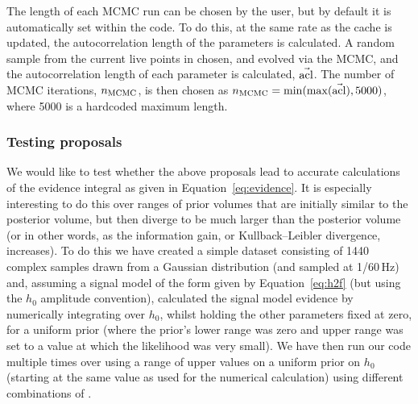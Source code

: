 The length of each MCMC run can be chosen by the user, but by default it is automatically set within the code. To do this,
at the same rate as the cache is updated, the autocorrelation length of the parameters is calculated. A random sample from the current
live points in chosen, and evolved via the MCMC, and the autocorrelation length of each parameter is calculated, $\vec{{\rm acl}}$. The number
of MCMC iterations, $n_{\rm MCMC}$, is then chosen as $n_{\rm MCMC} = {\rm min}({\rm max}(\vec{{\rm acl}}), 5000)$, where 5000 is
a hardcoded maximum length.

\subsubsection{Testing proposals}

We would like to test whether the above proposals lead to accurate calculations of the evidence integral as given in Equation~\ref{eq:evidence}.
It is especially interesting to do this over ranges of prior volumes that are initially similar to the posterior volume, but then diverge to be
much larger than the posterior volume (or in other words, as the information gain, or Kullback–Leibler divergence, increases). To do this
we have created a simple dataset consisting of 1440 complex samples drawn from a Gaussian distribution (and sampled at 1/60\,Hz) and, assuming
a signal model of the form given by Equation~\ref{eq:h2f} (but using the $h_0$ amplitude convention), calculated the signal model evidence
by numerically integrating over $h_0$, whilst holding the other parameters fixed at zero, for a uniform prior (where the prior's lower range was zero
and upper range was set to a value at which the likelihood was very small). We have then run our code multiple times over using a range of 
upper values on a uniform prior on $h_0$ (starting at the same value as used for the numerical calculation) using different combinations of
.


